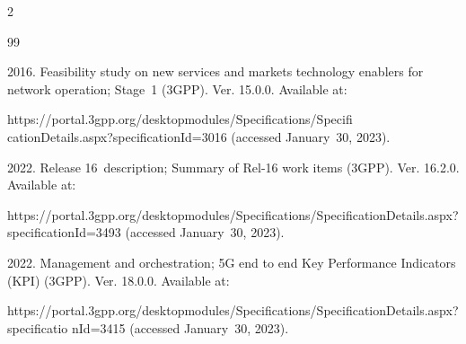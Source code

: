   \begin{multicols}{2}





\renewcommand{\bibname}{\protect\rmfamily References}







{\small\frenchspacing


 {%




 \begin{thebibliography}{99} 











2016. Feasibility study on new services and markets technology enablers for network operation; Stage~1 (3GPP). Ver. 15.0.0. Available at: 


{\sf https://\linebreak portal.3gpp.org/desktopmodules/Specifications/Specifi cationDetails.aspx?specificationId=3016} (accessed January~30, 2023).











2022. Release 16~description; Summary of Rel-16 work items (3GPP).  Ver. 16.2.0. Available at: 


{\sf https://portal.3gpp.org/desktop\linebreak  modules/Specifications/SpecificationDetails.aspx?speci\linebreak ficationId=3493} (accessed January~30, 2023).








2022. Management and orchestration; 5G end to end Key Performance Indicators (KPI) (3GPP). Ver. 18.0.0. Available at:


{\sf  https://\linebreak portal.3gpp.org/desktopmodules/Specifications/Specifi\linebreak cationDetails.aspx?specificatio nId=3415} (accessed January~30, 2023).



\end{thebibliography}}}
\end{multicols}
